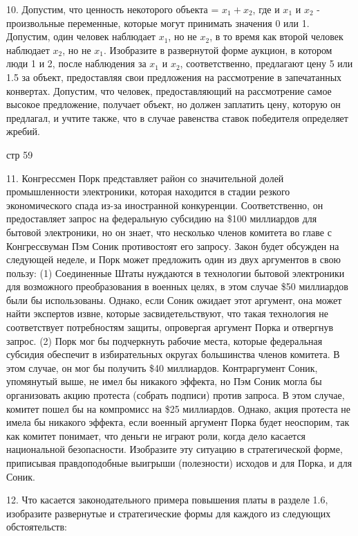 \documentclass[a4paper,12pt]{article}
\begin{document}
10. Допустим, что ценность некоторого объекта =
$x_{1}+x_{2}$, где и $x_{1}$ и $x_{2}$ -
произвольные переменные, которые могут принимать
значения 0 или 1. Допустим, один человек наблюдает
$x_{1}$, но не $x_{2}$, в то время как второй
человек наблюдает $x_{2}$, но не $x_{1}$.
Изобразите в развернутой форме аукцион, в котором
люди 1 и 2, после наблюдения за $x_{1}$ и $x_{2}$,
соответственно, предлагают цену 5 или 1.5 за
объект, предоставляя свои предложения на
рассмотрение в запечатанных конвертах. Допустим,
что человек, предоставляющий на рассмотрение самое
высокое предложение, получает объект, но должен
заплатить цену, которую он предлагал, и учтите
также, что в случае равенства ставок победителя
определяет жребий.

стр 59

11. Конгрессмен Порк представляет район со
значительной долей промышленности электроники,
которая находится в стадии резкого экономического
спада из-за иностранной конкуренции.
Соответственно, он предоставляет запрос на
федеральную субсидию на \$100 миллиардов для
бытовой электроники, но он знает, что несколько
членов комитета во главе с Конгрессвуман Пэм Соник
противостоят его запросу. Закон будет обсужден на
следующей неделе, и Порк может предложить один из
двух аргументов в свою пользу: (1) Соединенные
Штаты нуждаются в технологии бытовой электроники
для возможного преобразования в военных целях, в
этом случае \$50 миллиардов были бы использованы.
Однако, если Соник ожидает этот аргумент, она может
найти экспертов извне, которые засвидетельствуют,
что такая технология не соответствует потребностям
защиты, опровергая аргумент Порка и отвергнув
запрос. (2) Порк мог бы подчеркнуть рабочие места,
которые федеральная субсидия обеспечит в
избирательных округах большинства членов комитета.
В этом случае, он мог бы получить \$40 миллиардов.
Контраргумент Соник, упомянутый выше, не имел бы
никакого эффекта, но Пэм Соник могла бы
организовать акцию протеста (собрать подписи)
против запроса. В этом случае, комитет пошел бы на
компромисс на \$25 миллиардов. Однако, акция
протеста не имела бы никакого эффекта, если военный
аргумент Порка будет неоспорим, так как комитет
понимает, что деньги не играют роли, когда дело
касается национальной безопасности. Изобразите эту
ситуацию в стратегической форме, приписывая
правдоподобные выигрыши (полезности) исходов и для
Порка, и для Соник.

12. Что касается законодательного примера повышения
платы в разделе 1.6, изобразите развернутые и
стратегические формы для каждого из следующих
обстоятельств:
\end{document}
